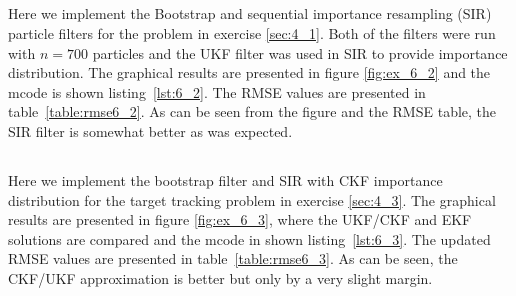 \documentclass[a4paper,oneside,article]{memoir}
\begin{document}
\subsection{}\label{sec:6_2}

Here we implement the Bootstrap and sequential importance resampling (SIR) particle filters 
for the problem in exercise \ref{sec:4_1}. Both of the filters were run with $n=700$ particles and
the UKF filter was used in SIR to provide importance distribution.
The graphical results are presented in figure \ref{fig:ex_6_2} and the
mcode is shown listing~\ref{lst:6_2}. The RMSE values are presented in table~\ref{table:rmse6_2}. As can be seen
from the figure and the RMSE table, the SIR filter is somewhat better as was expected.

\begin{table}[h]
	\centering
	
	\label{table:rmse6_2}
\end{table}


\clearpage



\subsection{}\label{sec:6_3}

Here we implement the bootstrap filter and SIR with CKF importance distribution for the target tracking problem in
exercise \ref{sec:4_3}. The graphical results are presented in figure \ref{fig:ex_6_3}, where the UKF/CKF and EKF solutions
are compared and the mcode in shown listing~\ref{lst:6_3}. The updated RMSE values are presented
in table~\ref{table:rmse6_3}. As can be seen, the CKF/UKF approximation is better but only by a very
slight margin. 

\begin{table}[h]
	\centering
	
	\label{table:rmse6_3}
\end{table}
\end{document}
